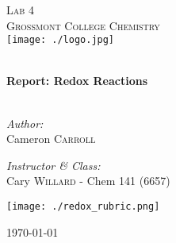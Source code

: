 \begin{titlepage}
\begin{center}

\textsc{\Large Lab 4}\\[1.5cm]
\textsc{\Large Grossmont College Chemistry}\\[0.5cm]
\texttt{[image: ./logo.jpg]}

\HRule \\[0.4cm]
{ \LARGE \bfseries Report: Redox Reactions}\\[0.5cm]

\HRule \\[1.5cm]

\begin{minipage}{0.4\textwidth}
\begin{flushleft} \large
\emph{Author:}\\
Cameron \textsc{Carroll}\\[0.2cm]

\end{flushleft}
\end{minipage}
\begin{minipage}{0.4\textwidth}
\begin{flushright} \large
\emph{Instructor \& Class:}\\
Cary \textsc{Willard} - Chem 141 (6657)
\end{flushright}
\end{minipage}

\begin{center}
  \texttt{[image: ./redox\_rubric.png]}\\[0.7cm]
\end{center}

\vfill

{\large \today}

\end{center}
\end{titlepage}
